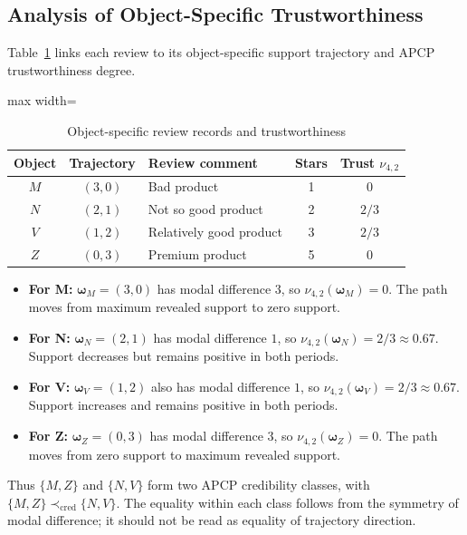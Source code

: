 \documentclass[conference]{IEEEtran}
\theoremstyle{plain}
\theoremstyle{definition}
\theoremstyle{remark}
\begin{document}
	\subsection{Analysis of Object-Specific Trustworthiness}
	Table~\ref{tab:table3} links each review to its object-specific support trajectory and APCP trustworthiness degree.
	\begin{table}[H]
		\begin{center}
			\caption{Object-specific review records and trustworthiness}
			\label{tab:table3}
			\begin{adjustbox}{max width=\columnwidth}
			\begin{tabular}{|c|c|p{3.2cm}|c|c|}
				\hline
				Object & Trajectory & Review comment & Stars & Trust $\nu_{4,2}$\\
				\hline
				$M$ & $(3,0)$ & Bad product & 1 & $0$\\
				$N$ & $(2,1)$ & Not so good product & 2 & $2/3$\\
				$V$ & $(1,2)$ & Relatively good product & 3 & $2/3$\\
				$Z$ & $(0,3)$ & Premium product & 5 & $0$\\
				\hline
			\end{tabular}
			\end{adjustbox}
		\end{center}
	\end{table}
	\begin{itemize}
		\item[(i)] 	\textbf{For M:} $\boldsymbol\omega_M=(3,0)$ has modal difference $3$, so $\nu_{4,2}(\boldsymbol\omega_M)=0$. The path moves from maximum revealed support to zero support.
		\item[(ii)] 	\textbf{For N:} $\boldsymbol\omega_N=(2,1)$ has modal difference $1$, so $\nu_{4,2}(\boldsymbol\omega_N)=2/3\approx0.67$. Support decreases but remains positive in both periods.
		\item[(iii)] 	\textbf{For V:} $\boldsymbol\omega_V=(1,2)$ also has modal difference $1$, so $\nu_{4,2}(\boldsymbol\omega_V)=2/3\approx0.67$. Support increases and remains positive in both periods.
		\item[(iv)] 	\textbf{For Z:} $\boldsymbol\omega_Z=(0,3)$ has modal difference $3$, so $\nu_{4,2}(\boldsymbol\omega_Z)=0$. The path moves from zero support to maximum revealed support.
	\end{itemize}
	Thus $\{M,Z\}$ and $\{N,V\}$ form two APCP credibility classes, with $\{M,Z\}\prec_{\mathrm{cred}}\{N,V\}$. The equality within each class follows from the symmetry of modal difference; it should not be read as equality of trajectory direction.
\end{document}
